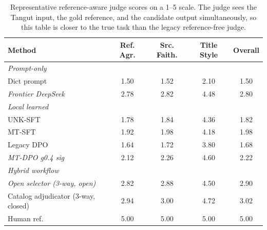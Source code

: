 \begin{table}[t]
\centering
\small
\begin{tabular}{lcccc}
\toprule
Method & Ref. Agr. & Src. Faith. & Title Style & Overall \\
\midrule
\multicolumn{5}{l}{\textit{Prompt-only}} \\
Dict prompt & 1.50 & 1.52 & 2.10 & 1.50 \\
\textit{Frontier DeepSeek} & 2.78 & 2.82 & 4.48 & 2.80 \\
\midrule
\multicolumn{5}{l}{\textit{Local learned}} \\
UNK-SFT & 1.78 & 1.84 & 4.36 & 1.82 \\
MT-SFT & 1.92 & 1.98 & 4.18 & 1.98 \\
Legacy DPO & 1.64 & 1.72 & 3.80 & 1.68 \\
\textit{MT-DPO g0.4 sig} & 2.12 & 2.26 & 4.60 & 2.22 \\
\midrule
\multicolumn{5}{l}{\textit{Hybrid workflow}} \\
\textit{Open selector (3-way, open)} & 2.82 & 2.88 & 4.50 & 2.90 \\
Catalog adjudicator (3-way, closed) & 2.94 & 3.00 & 4.72 & 3.02 \\
\midrule
Human ref. & 5.00 & 5.00 & 5.00 & 5.00 \\
\bottomrule
\end{tabular}
\caption{Representative reference-aware judge scores on a 1--5 scale. The judge sees the Tangut input, the gold reference, and the candidate output simultaneously, so this table is closer to the true task than the legacy reference-free judge.}
\label{tab:reference-aware-eval}
\end{table}
